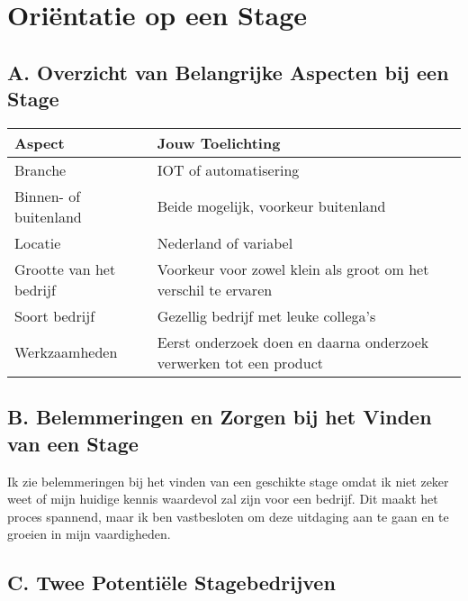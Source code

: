 \section{Oriëntatie op een Stage}
\subsection{A. Overzicht van Belangrijke Aspecten bij een Stage}

\begin{tabular}{|l|l|}
    \hline
    \textbf{Aspect} & \textbf{Jouw Toelichting} \\
    \hline
    Branche & IOT of automatisering \\
    Binnen- of buitenland & Beide mogelijk, voorkeur buitenland \\
    Locatie & Nederland of variabel \\
    Grootte van het bedrijf & Voorkeur voor zowel klein als groot om het verschil te ervaren \\
    Soort bedrijf & Gezellig bedrijf met leuke collega's \\
    Werkzaamheden & Eerst onderzoek doen en daarna onderzoek verwerken tot een product \\
    \hline
\end{tabular}

\subsection{B. Belemmeringen en Zorgen bij het Vinden van een Stage}
Ik zie belemmeringen bij het vinden van een geschikte stage omdat ik niet zeker weet of mijn huidige kennis waardevol zal zijn voor een bedrijf. Dit maakt het proces spannend, maar ik ben vastbesloten om deze uitdaging aan te gaan en te groeien in mijn vaardigheden.

\subsection{C. Twee Potentiële Stagebedrijven}
